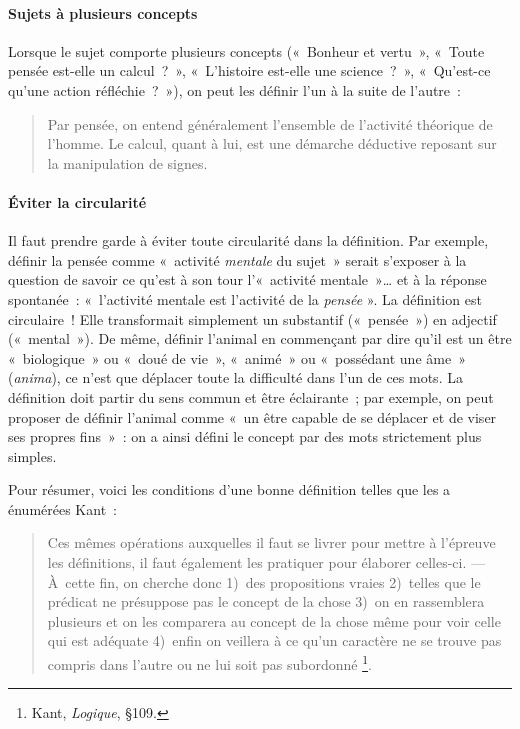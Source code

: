 \documentclass[a4paper]{article}
\begin{document}
\paragraph{Sujets à plusieurs concepts}
\label{sec-2-2-1-6}


Lorsque le sujet comporte plusieurs concepts (« Bonheur et vertu », « Toute
pensée est-elle un calcul ? », « L'histoire est-elle une science ? »,
« Qu'est-ce qu'une action réfléchie ? »), on peut les définir l'un à la
suite de l'autre :

\begin{quote}
Par pensée, on entend généralement l'ensemble de l'activité théorique
de l'homme. Le calcul, quant à lui, est une démarche déductive
reposant sur la manipulation de signes.
\end{quote}
\paragraph{Éviter la circularité}
\label{sec-2-2-1-7}


Il faut prendre garde à éviter toute circularité dans la définition. Par
exemple, définir la pensée comme « activité \emph{mentale} du sujet » serait
s'exposer à la question de savoir ce qu'est à son tour l'« activité
mentale »\ldots{} et à la réponse spontanée : « l'activité mentale est
l'activité de la \emph{pensée} ». La définition est circulaire ! Elle
transformait simplement un substantif (« pensée ») en adjectif (« mental »).
De même, définir l'animal en commençant par dire qu'il est un être
« biologique » ou « doué de vie », « animé » ou « possédant une âme » (\emph{anima}),
ce n'est que déplacer toute la difficulté dans l'un de ces mots. La
définition doit partir du sens commun et être éclairante ; par exemple,
on peut proposer de définir l'animal comme « un être capable de se
déplacer et de viser ses propres fins » : on a ainsi défini le concept
par des mots strictement plus simples.

Pour résumer, voici les conditions d'une bonne définition telles que les
a énumérées Kant :

\begin{quote}
Ces mêmes opérations auxquelles il faut se livrer pour mettre à
l'épreuve les définitions, il faut également les pratiquer pour
élaborer celles-ci. --- À cette fin, on cherche donc 1) des
propositions vraies 2) telles que le prédicat ne présuppose pas le
concept de la chose 3) on en rassemblera plusieurs et on les comparera
au concept de la chose même pour voir celle qui est adéquate 4) enfin
on veillera à ce qu'un caractère ne se trouve pas compris dans l'autre
ou ne lui soit pas subordonné \footnote{Kant, \emph{Logique}, §109.
 }.
\end{quote}
\end{document}
